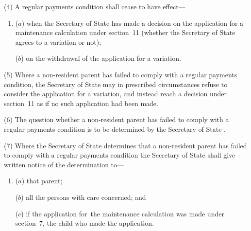 \documentclass[12pt,a4paper]{article}
\begin{document}
(4) A regular payments condition shall cease to have effect—
\begin{enumerate}\item[]
($a$) when the 
Secretary of State  %
has made a decision on the application for a maintenance calculation under section~11 (whether 
the Secretary of State  %
agrees to a variation or not);

($b$) on the withdrawal of the application for a variation.
\end{enumerate}

(5) Where a non-resident parent has failed to comply with a regular payments condition, the 
Secretary of State  %
may in prescribed circumstances refuse to consider the application for a variation, and instead reach 
a  %
decision under section~11 as if no such application had been made.

(6) The question whether a non-resident parent has failed to comply with a regular payments condition is to be determined by the 
Secretary of State%
.

(7) Where the 
Secretary of State  %
determines that a non-resident parent has failed to comply with a regular payments condition 
the Secretary of State  %
shall give written notice of 
the  %
determination to—
\begin{enumerate}\item[]
($a$) that parent;

($b$) all the persons with care concerned; and

($c$) if the application for~the maintenance calculation was made under section~7, the child who made the application.
\end{enumerate}
\end{document}
